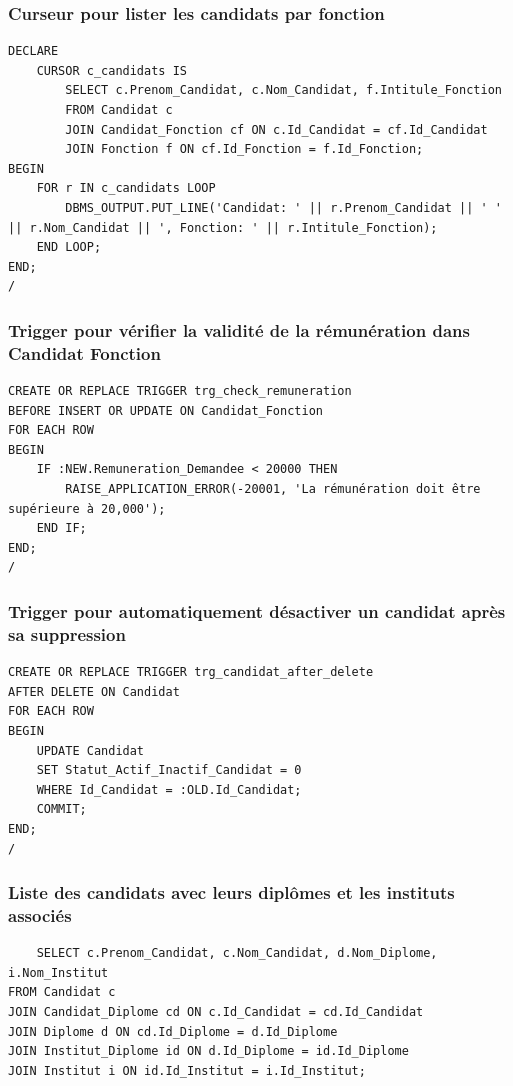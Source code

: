 \documentclass[a4paper,12pt]{article}
\begin{document}
\subsubsection*{Curseur pour lister les candidats par fonction}
\begin{verbatim}
DECLARE
    CURSOR c_candidats IS
        SELECT c.Prenom_Candidat, c.Nom_Candidat, f.Intitule_Fonction
        FROM Candidat c
        JOIN Candidat_Fonction cf ON c.Id_Candidat = cf.Id_Candidat
        JOIN Fonction f ON cf.Id_Fonction = f.Id_Fonction;
BEGIN
    FOR r IN c_candidats LOOP
        DBMS_OUTPUT.PUT_LINE('Candidat: ' || r.Prenom_Candidat || ' ' || r.Nom_Candidat || ', Fonction: ' || r.Intitule_Fonction);
    END LOOP;
END;
/
\end{verbatim}
\subsubsection*{Trigger pour vérifier la validité de la rémunération dans Candidat Fonction}
\begin{verbatim}
CREATE OR REPLACE TRIGGER trg_check_remuneration
BEFORE INSERT OR UPDATE ON Candidat_Fonction
FOR EACH ROW
BEGIN
    IF :NEW.Remuneration_Demandee < 20000 THEN
        RAISE_APPLICATION_ERROR(-20001, 'La rémunération doit être supérieure à 20,000');
    END IF;
END;
/
\end{verbatim}
\subsubsection*{Trigger pour automatiquement désactiver un candidat après sa suppression}
\begin{verbatim}
CREATE OR REPLACE TRIGGER trg_candidat_after_delete
AFTER DELETE ON Candidat
FOR EACH ROW
BEGIN
    UPDATE Candidat
    SET Statut_Actif_Inactif_Candidat = 0
    WHERE Id_Candidat = :OLD.Id_Candidat;
    COMMIT;
END;
/
\end{verbatim}
\subsubsection*{Liste des candidats avec leurs diplômes et les instituts associés}
\begin{verbatim}
    SELECT c.Prenom_Candidat, c.Nom_Candidat, d.Nom_Diplome, i.Nom_Institut
FROM Candidat c
JOIN Candidat_Diplome cd ON c.Id_Candidat = cd.Id_Candidat
JOIN Diplome d ON cd.Id_Diplome = d.Id_Diplome
JOIN Institut_Diplome id ON d.Id_Diplome = id.Id_Diplome
JOIN Institut i ON id.Id_Institut = i.Id_Institut;
\end{verbatim}
\end{document}

